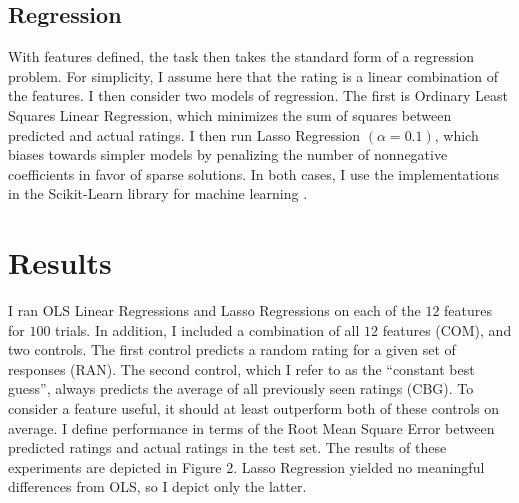 \subsection{Regression}
With features defined, the task then takes the standard form of a regression problem. For simplicity, I assume here that the rating is a linear combination of the features. I then consider two models of regression. The first is Ordinary Least Squares Linear Regression, which minimizes the sum of squares between predicted and actual ratings. I then run Lasso Regression $(\alpha = 0.1)$, which biases towards simpler models by penalizing the number of nonnegative coefficients in favor of sparse solutions. In both cases, I use the implementations in the Scikit-Learn library for machine learning  \citep{pedregosa2011scikit}.
\section{Results}
I ran OLS Linear Regressions and Lasso Regressions on each of the $12$ features for $100$ trials. In addition, I included a combination of all $12$ features (COM), and two controls. The first control predicts a random rating for a given set of responses (RAN). The second control, which I refer to as the ``constant best guess'', always predicts the average of all previously seen ratings (CBG). To consider a feature useful, it should at least outperform both of these controls on average. I define performance in terms of the Root Mean Square Error between predicted ratings and actual ratings in the test set. The results of these experiments are depicted in Figure 2. Lasso Regression yielded no meaningful differences from OLS, so I depict only the latter.
